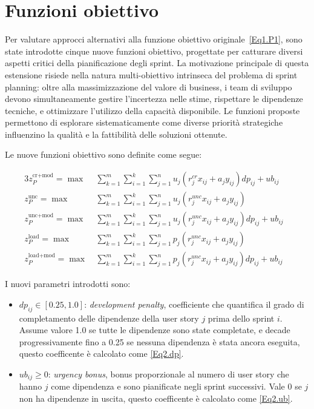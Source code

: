 \documentclass[12pt,a4paper,openright,twoside]{book}
\begin{document}
\section{Funzioni obiettivo}\label{sec:fo}

Per valutare approcci alternativi alla funzione obiettivo originale~\eqref{Eq1.P1}, sono state introdotte cinque nuove funzioni obiettivo, progettate per catturare diversi aspetti critici della pianificazione degli sprint. La motivazione principale di questa estensione risiede nella natura multi-obiettivo intrinseca del problema di sprint planning: oltre alla massimizzazione del valore di business, i team di sviluppo devono simultaneamente gestire l'incertezza nelle stime, rispettare le dipendenze tecniche, e ottimizzare l'utilizzo della capacità disponibile. Le funzioni proposte permettono di esplorare sistematicamente come diverse priorità strategiche influenzino la qualità e la fattibilità delle soluzioni ottenute.


Le nuove funzioni obiettivo sono definite come segue:

\begin{alignat}{3}
z_P^\text{cr+mod}  = \max  &\ \sum_{k=1}^m \sum_{i=1}^{k} \sum_{j=1}^{n} u_j \left( r_j^{cr} x_{ij} + a_j y_{ij} \right) dp_{ij} + ub_{ij}
    &\label{Eq2.P1}\\
z_P^\text{unc}  = \max  &\ \sum_{k=1}^m \sum_{i=1}^{k} \sum_{j=1}^{n} u_j \left( r_j^{unc} x_{ij} + a_j y_{ij} \right) 
    &\label{Eq2.P2}\\
z_P^\text{unc+mod}  = \max  &\ \sum_{k=1}^m \sum_{i=1}^{k} \sum_{j=1}^{n} u_j \left( r_j^{unc} x_{ij} + a_j y_{ij} \right) dp_{ij} + ub_{ij}
    &\label{Eq2.P3}\\
z_P^\text{load}  = \max  &\ \sum_{k=1}^m \sum_{i=1}^{k} \sum_{j=1}^{n} p_j \left( r_j^{unc} x_{ij} + a_j y_{ij} \right)
    &\label{Eq2.P4}\\
z_P^\text{load+mod}  = \max  &\ \sum_{k=1}^m \sum_{i=1}^{k} \sum_{j=1}^{n} p_j \left( r_j^{unc} x_{ij} + a_j y_{ij} \right) dp_{ij} + ub_{ij}
    &\label{Eq2.P5}
\end{alignat}

I nuovi parametri introdotti sono:

\begin{itemize}
    \item \(dp_{ij} \in [0.25, 1.0]\): \textit{development penalty}, coefficiente che quantifica il grado di completamento delle dipendenze della user story $j$ prima dello sprint $i$. Assume valore 1.0 se tutte le dipendenze sono state completate, e decade progressivamente fino a 0.25 se nessuna dipendenza è stata ancora eseguita, questo coefficente è calcolato come \eqref{Eq2.dp}.
    
    \item \(ub_{ij} \geq 0\): \textit{urgency bonus}, bonus proporzionale al numero di user story che hanno $j$ come dipendenza e sono pianificate negli sprint successivi. Vale 0 se $j$ non ha dipendenze in uscita, questo coefficente è calcolato come \eqref{Eq2.ub}.
\end{itemize}
\end{document}
